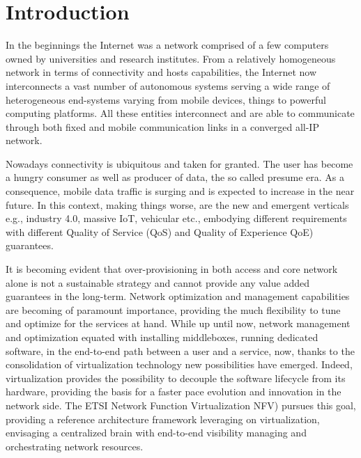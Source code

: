 \chapter{Introduction}
\label{chap:intro}
In the beginnings the Internet was a network comprised of a few computers owned
by universities and research institutes. From a relatively homogeneous network
in terms of connectivity and hosts capabilities, the Internet now interconnects
a vast number of autonomous systems serving a wide range of heterogeneous
end-systems varying from mobile devices, things to powerful computing
platforms. All these entities interconnect and are able to communicate through
both fixed and mobile communication links in a converged all-IP network. 

Nowadays connectivity is ubiquitous and taken for granted. The user has become
a hungry consumer as well as producer of data, the so called presume era. As a
consequence, mobile data traffic is surging and is expected to increase in the
near future. In this context, making things worse, are the new and emergent
verticals e.g., industry 4.0, massive IoT, vehicular etc., embodying different
requirements with different Quality of Service (QoS) and Quality of Experience 
QoE) guarantees. 

It is becoming evident that over-provisioning in both access and core network
alone is not a sustainable strategy and cannot provide any value added
guarantees in the long-term. Network optimization and management capabilities
are becoming of paramount importance, providing the much flexibility to tune
and optimize for the services at hand. While up until now, network management
and optimization equated with installing middleboxes, running dedicated
software, in the end-to-end path between a user and a service, now, thanks to
the consolidation of virtualization technology new possibilities have emerged.
Indeed, virtualization provides the possibility to decouple the software
lifecycle from its hardware, providing the basis for a faster pace evolution
and innovation in the network side. The ETSI Network Function Virtualization 
NFV) pursues this goal, providing a reference architecture framework leveraging
on virtualization, envisaging a centralized brain with end-to-end visibility
managing and orchestrating network resources.

